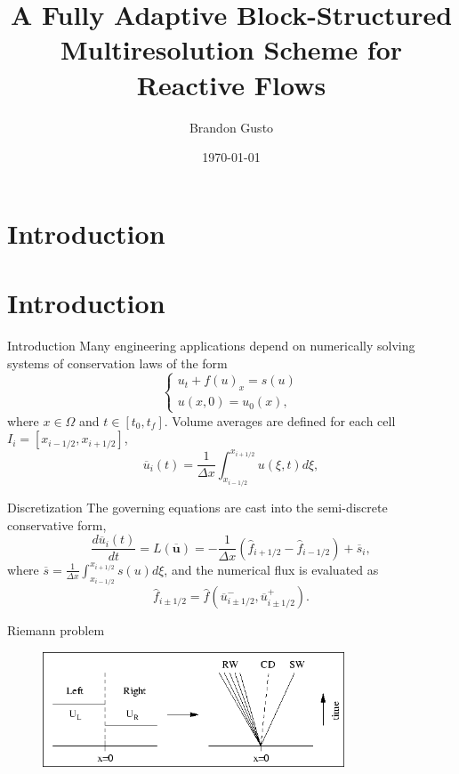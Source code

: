 \documentclass{beamer}
\begin{document}
\section{Introduction}
\title{A Fully Adaptive Block-Structured Multiresolution Scheme for
Reactive Flows}
\author{Brandon Gusto} %
\date{\today}
\frame{\titlepage}

\section{Introduction}

\begin{frame}{Introduction}
    Many engineering applications depend on numerically solving systems of conservation laws of the form
    \begin{equation}
    \begin{cases}
      u_{t} + f(u)_{x} = s(u) \\
      u(x,0) = u_{0}(x),
    \end{cases}
    \label{claw}
    \end{equation}
    where $x \in \Omega$ and $t \in [t_{0},t_{f}]$.
    Volume averages are defined for each cell $I_{i} =
    \left[x_{i-1/2},x_{i+1/2}\right]$,
    \begin{equation}
        \overline{u}_{i}(t) = \frac{1}{\Delta x} \int_{x_{i-1/2}}^{x_{i+1/2}} u(\xi,t) d \xi,
    \end{equation}
\end{frame}

\begin{frame}{Discretization}
    The governing equations are cast into the semi-discrete conservative form,
    \begin{equation}
        \frac{d \overline{u}_{i}(t)}{dt} = L(\overline{\bm{u}}) = -\frac{1}{\Delta x} \left( \hat{f}_{i+1/2} -
        \hat{f}_{i-1/2} \right) + \overline{s}_{i},
        \label{ode}
    \end{equation}
    where $\overline{s} = \frac{1}{\Delta x} \int_{x_{i-1/2}}^{x_{i+1/2}} s(u) d
    \xi$, and the numerical flux is evaluated as
    \begin{equation}
        \hat{f}_{i\pm1/2} = \hat{f}(\overline{u}^{-}_{i\pm1/2}, \overline{u}^{+}_{i\pm1/2}).
    \end{equation}
\end{frame}

\begin{frame}{Riemann problem}
    \begin{figure}
        \center
        \includegraphics[width=0.8\textwidth]{riemann.png}
    \end{figure}
\end{frame}
\end{document}
